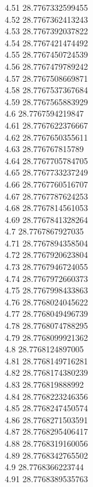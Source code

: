 {4.51	28.7767332599455\\
4.52	28.7767362413243\\
4.53	28.7767392037822\\
4.54	28.7767421474492\\
4.55	28.7767450724539\\
4.56	28.7767479789242\\
4.57	28.7767508669871\\
4.58	28.7767537367684\\
4.59	28.7767565883929\\
4.6	28.7767594219847\\
4.61	28.7767622376667\\
4.62	28.7767650355611\\
4.63	28.776767815789\\
4.64	28.7767705784705\\
4.65	28.7767733237249\\
4.66	28.7767760516707\\
4.67	28.7767787624253\\
4.68	28.7767814561053\\
4.69	28.7767841328264\\
4.7	28.7767867927035\\
4.71	28.7767894358504\\
4.72	28.7767920623804\\
4.73	28.7767946724055\\
4.74	28.7767972660373\\
4.75	28.7767998433863\\
4.76	28.7768024045622\\
4.77	28.7768049496739\\
4.78	28.7768074788295\\
4.79	28.7768099921362\\
4.8	28.7768124897005\\
4.81	28.7768149716281\\
4.82	28.7768174380239\\
4.83	28.776819888992\\
4.84	28.7768223246356\\
4.85	28.7768247450574\\
4.86	28.7768271503591\\
4.87	28.7768295406417\\
4.88	28.7768319160056\\
4.89	28.7768342765502\\
4.9	28.7768366223744\\
4.91	28.7768389535763\\
}

